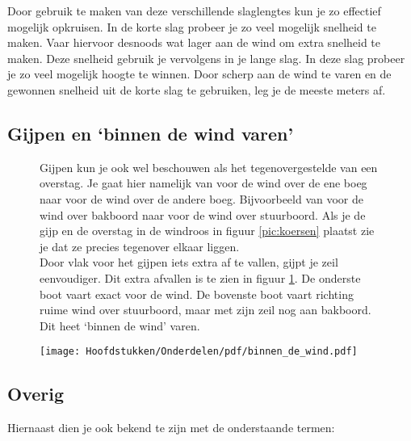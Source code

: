 \newpage

Door gebruik te maken van deze verschillende slaglengtes kun je zo effectief mogelijk opkruisen. In de korte slag probeer je zo veel mogelijk snelheid te maken. Vaar hiervoor desnoods wat lager aan de wind om extra snelheid te maken. Deze snelheid gebruik je vervolgens in je lange slag. In deze slag probeer je zo veel mogelijk hoogte te winnen. Door scherp aan de wind te varen en de gewonnen snelheid uit de korte slag te gebruiken, leg je de meeste meters af.

\subsection{Gijpen en `binnen de wind varen'}
\begin{figure}[H]
	\centering
	\begin{minipage}[t]{0.78\textwidth}
		\vspace{-5cm}
		Gijpen kun je ook wel beschouwen als het tegenovergestelde van een overstag. Je gaat hier namelijk van voor de wind over de ene boeg naar voor de wind over de andere boeg. Bijvoorbeeld van voor de wind over bakboord naar voor de wind over stuurboord. Als je de gijp en de overstag in de windroos in figuur \ref{pic:koersen} plaatst zie je dat ze precies tegenover elkaar liggen.\\
		
		
		Door vlak voor het gijpen iets extra af te vallen, gijpt je zeil eenvoudiger. Dit extra afvallen is te zien in figuur \ref{pic:binnen_wind}. De onderste boot vaart exact voor de wind. De bovenste boot vaart richting ruime wind over stuurboord, maar met zijn zeil nog aan bakboord. Dit heet `binnen de wind' varen.
	\end{minipage}
	\hfill
	\begin{minipage}[b]{0.18\textwidth}
		\centering
		\texttt{[image: Hoofdstukken/Onderdelen/pdf/binnen\_de\_wind.pdf]}
		\caption{}
		\label{pic:binnen_wind}
	\end{minipage}
\end{figure}


\subsection{Overig}
Hiernaast dien je ook bekend te zijn met de onderstaande termen:

